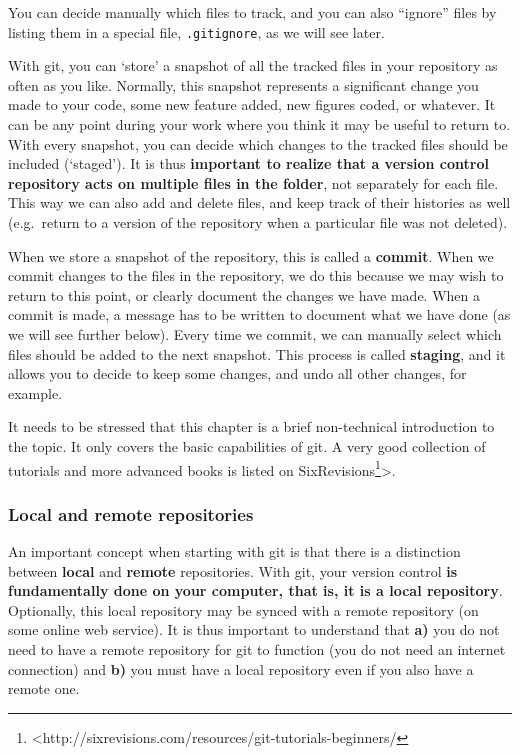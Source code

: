 \documentclass[]{book}
\let\rmarkdownfootnote\footnote%
\def\footnote{\protect\rmarkdownfootnote}
\let\BeginKnitrBlock\begin \let\EndKnitrBlock\end
\begin{document}
You can decide manually which files to track, and you can also ``ignore'' files by listing them in a special file, \texttt{.gitignore}, as we will see later.

With git, you can `store' a snapshot of all the tracked files in your repository as often as you like. Normally, this snapshot represents a significant change you made to your code, some new feature added, new figures coded, or whatever. It can be any point during your work where you think it may be useful to return to. With every snapshot, you can decide which changes to the tracked files should be included (`staged'). It is thus \textbf{important to realize that a version control repository acts on multiple files in the folder}, not separately for each file. This way we can also add and delete files, and keep track of their histories as well (e.g.~return to a version of the repository when a particular file was not deleted).

When we store a snapshot of the repository, this is called a \textbf{commit}. When we commit changes to the files in the repository, we do this because we may wish to return to this point, or clearly document the changes we have made. When a commit is made, a message has to be written to document what we have done (as we will see further below). Every time we commit, we can manually select which files should be added to the next snapshot. This process is called \textbf{staging}, and it allows you to decide to keep some changes, and undo all other changes, for example.

\BeginKnitrBlock{rmdreading}
It needs to be stressed that this chapter is a brief non-technical introduction to the topic. It only covers the basic capabilities of git. A very good collection of tutorials and more advanced books is listed on SixRevisions\footnote{<http://sixrevisions.com/resources/git-tutorials-beginners/}\textgreater.
\EndKnitrBlock{rmdreading}

\hypertarget{local-and-remote-repositories}{%
\subsubsection{Local and remote repositories}\label{local-and-remote-repositories}}

An important concept when starting with git is that there is a distinction between \textbf{local} and \textbf{remote} repositories. With git, your version control \textbf{is fundamentally done on your computer, that is, it is a local repository}. Optionally, this local repository may be synced with a remote repository (on some online web service). It is thus important to understand that \textbf{a)} you do not need to have a remote repository for git to function (you do not need an internet connection) and \textbf{b)} you must have a local repository even if you also have a remote one.
\end{document}
